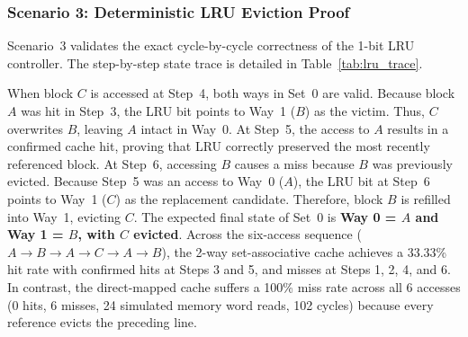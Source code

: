 \documentclass[conference]{IEEEtran}
\begin{document}
\subsubsection{Scenario 3: Deterministic LRU Eviction Proof}
Scenario~3 validates the exact cycle-by-cycle correctness of the 1-bit LRU controller. The step-by-step state trace is detailed in Table~\ref{tab:lru_trace}.

\begin{table}[htbp]
\caption{Cycle-by-Cycle Trace of Scenario 3 ($A \to B \to A \to C \to A \to B$)}
\label{tab:lru_trace}
\centering
{}
\end{table}

When block $C$ is accessed at Step~4, both ways in Set~0 are valid. Because block $A$ was hit in Step~3, the LRU bit points to Way~1 ($B$) as the victim. Thus, $C$ overwrites $B$, leaving $A$ intact in Way~0. At Step~5, the access to $A$ results in a confirmed cache hit, proving that LRU correctly preserved the most recently referenced block. At Step~6, accessing $B$ causes a miss because $B$ was previously evicted. Because Step~5 was an access to Way~0 ($A$), the LRU bit at Step~6 points to Way~1 ($C$) as the replacement candidate. Therefore, block $B$ is refilled into Way~1, evicting $C$. The expected final state of Set~0 is \textbf{Way 0 = $A$ and Way 1 = $B$, with $C$ evicted}. Across the six-access sequence ($A \to B \to A \to C \to A \to B$), the 2-way set-associative cache achieves a 33.33\% hit rate with confirmed hits at Steps 3 and 5, and misses at Steps 1, 2, 4, and 6. In contrast, the direct-mapped cache suffers a 100\% miss rate across all 6 accesses (0 hits, 6 misses, 24 simulated memory word reads, 102 cycles) because every reference evicts the preceding line.
\end{document}
